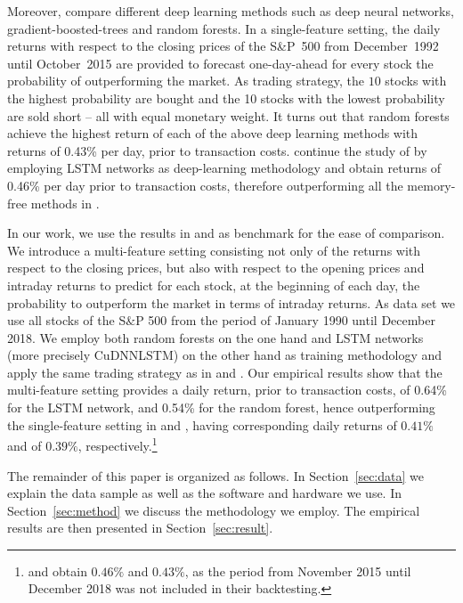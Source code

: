 \documentclass[review]{elsarticle}
\begin{document}
Moreover,
\cite{krauss17}  compare different deep learning methods such as deep neural networks, gradient-boosted-trees and random forests. In a single-feature setting, the daily returns with respect to the closing prices of the S\&P~500
 from December~1992 until October~2015 
are provided to forecast one-day-ahead for every stock the probability of outperforming the market. As trading strategy, the $10$ stocks with the highest probability are bought and the 10 stocks with the lowest probability are sold short -- all with equal monetary weight.  It turns out that random forests achieve the highest return of each of the above deep learning methods with returns of 0.43\% per day, prior to transaction costs. \cite{krauss18} continue the study of \cite{krauss17} by employing LSTM networks as deep-learning  methodology and obtain returns of 0.46\% per day prior to transaction costs, therefore outperforming all the memory-free methods in \cite{krauss17}.

In our work, we use the results in \cite{krauss17} and \cite{krauss18} as benchmark for the ease of comparison. We introduce a multi-feature setting consisting not only of the returns with respect to the closing prices, but also with respect to the opening prices and intraday returns to predict for each stock, at the beginning of each day, the probability to outperform  the market in terms of intraday returns. As data set we use all stocks of the S$\&$P 500 from the period of January 1990 until December 2018.
We employ both random forests on the one hand and LSTM networks (more precisely CuDNNLSTM) on the other hand as training methodology and apply the same trading strategy as in  \cite{krauss17} and \cite{krauss18}. Our empirical results show that the multi-feature setting provides a daily return, prior to transaction costs, of 0.64\% for the LSTM network, and 0.54\% for the random forest, hence outperforming the single-feature setting in \cite{krauss18} and \cite{krauss17}, having corresponding daily returns of  $0.41\%$ and of $0.39\%$, respectively.\footnote{\cite{krauss18} and  \cite{krauss17} obtain $0.46\%$ and $0.43\%$, as the period from November 2015 until December 2018 was not included in their backtesting.}

The  remainder of this paper is organized as follows. 
In Section~\ref{sec:data} we explain the data sample as well as the software and  hardware we use. In Section~\ref{sec:method} we discuss the methodology we employ. The empirical results are then presented
in Section~\ref{sec:result}.
\end{document}
